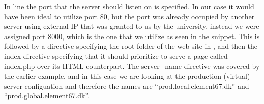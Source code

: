 In line  the port that the server should listen on is specified. In our case it would have been ideal to utilize port 80, but the port was already occupied by another server using external IP that was granted to us by the university, instead we were assigned port 8000, which is the one that we utilize as seen in the snippet. This is followed by a directive specifying the root folder of the web site in , and then the index directive specifying that it should prioritize to serve a page called index.php over its HTML counterpart. The server\_name directive was covered by the earlier example, and in this case we are looking at the production (virtual) server configuation and therefore the names are ``prod.local.element67.dk'' and ``prod.global.element67.dk''.



